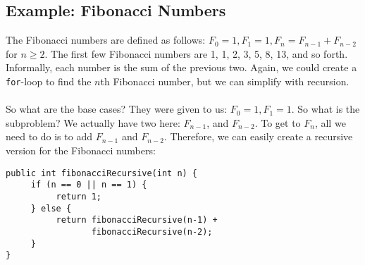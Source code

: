 \subsection{Example: Fibonacci Numbers}
The Fibonacci numbers are defined as follows: $F_0 = 1, F_1 = 1, F_n = F_{n-1} + F_{n-2}$ for $n \ge 2$. The first few Fibonacci numbers are 1, 1, 2, 3, 5, 8, 13, and so forth. Informally, each number is the sum of the previous two. Again, we could create a \verb|for|-loop to find the $n$th Fibonacci number, but we can simplify with recursion.
\\ \\
So what are the base cases? They were given to us: $F_0 = 1, F_1 = 1$. So what is the subproblem? We actually have two here: $F_{n-1}$, and $F_{n-2}$. To get to $F_n$, all we need to do is to add $F_{n-1}$ and $F_{n-2}$. Therefore, we can easily create a recursive version for the Fibonacci numbers:
\begin{lstlisting}
public int fibonacciRecursive(int n) {
     if (n == 0 || n == 1) {
          return 1;
     } else {
          return fibonacciRecursive(n-1) + 
                 fibonacciRecursive(n-2);
     }
}
\end{lstlisting}

